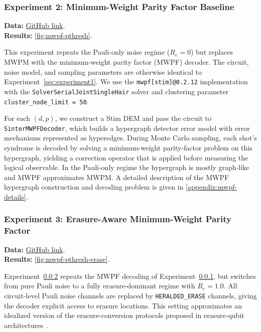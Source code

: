 \documentclass[11pt, notitlepage, letterpaper]{article}
\begin{document}
\subsubsection{Experiment 2: Minimum-Weight Parity Factor Baseline}\label{sec:experiment2}

\textbf{Data:}
\href{https://github.com/leigh-johnson/C191A-qubit-minesweeper/tree/main/datasets/circuit%3Dsurface_code%3Arotated_memory_x/decoder%3Dmwpf/erasure%3D0.0/solver%3DSolverSerialJointSingleHair}{GitHub link}.\\
\textbf{Results:} \autoref{fig:mwpf-pthresh}.

This experiment repeats the Pauli-only noise regime ($R_e = 0$) but replaces MWPM with the minimum-weight parity factor (MWPF) decoder. The circuit, noise model, and sampling parameters are otherwise identical to Experiment~\ref{sec:experiment1}. We use the \texttt{mwpf[stim]@0.2.12} implementation with the \texttt{SolverSerialJointSingleHair} solver and clustering parameter \texttt{cluster\_node\_limit = 50}.

For each $(d,p)$, we construct a Stim DEM and pass the circuit to \texttt{SinterMWPFDecoder}, which builds a hypergraph detector error model with error mechanisms represented as hyperedges. During Monte Carlo sampling, each shot’s syndrome is decoded by solving a minimum-weight parity-factor problem on this hypergraph, yielding a correction operator that is applied before measuring the logical observable.
In the Pauli-only regime the hypergraph is mostly graph-like and MWPF approximates MWPM. A detailed description of the MWPF hypergraph construction and decoding problem is given in \autoref{appendix:mwpf-details}.

\subsubsection{Experiment 3: Erasure-Aware Minimum-Weight Parity Factor}\label{sec:experiment3}

\textbf{Data:}
\href{https://github.com/leigh-johnson/C191A-qubit-minesweeper/tree/main/datasets/circuit%3Dsurface_code%3Arotated_memory_x/decoder%3Dmwpf/erasure%3D1.0/solver%3DSolverSerialJointSingleHair}{GitHub link}.\\
\textbf{Results:} \autoref{fig:mwpf-pthresh-erase}.

Experiment~\ref{sec:experiment3} repeats the MWPF decoding of Experiment~\ref{sec:experiment2}, but switches from pure Pauli noise to a fully erasure-dominant regime with $R_e = 1.0$. All circuit-level Pauli noise channels are replaced by \texttt{HERALDED\_ERASE} channels, giving the decoder explicit access to erasure locations. This setting approximates an idealized version of the erasure-conversion protocols proposed in erasure-qubit architectures~\cite{wu_erasure_2022}.
\end{document}
